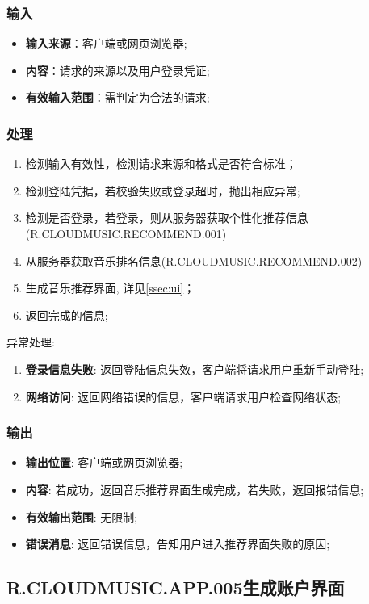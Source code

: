 \begin{enumerate}
\subsubsection{输入}
	\begin{itemize}
		\item \textbf{输入来源}：客户端或网页浏览器;
		\item \textbf{内容}：请求的来源以及用户登录凭证;
		\item \textbf{有效输入范围}：需判定为合法的请求;
	\end{itemize}
\subsubsection{处理}
	\begin{enumerate}
		\item 检测输入有效性，检测请求来源和格式是否符合标准；
		\item 检测登陆凭据，若校验失败或登录超时，抛出相应异常;
    \item 检测是否登录，若登录，则从服务器获取个性化推荐信息(R.CLOUDMUSIC.RECOMMEND.001)
		\item 从服务器获取音乐排名信息(R.CLOUDMUSIC.RECOMMEND.002)
		\item 生成音乐推荐界面, 详见\ref{ssec:ui}；
		\item 返回完成的信息;
	\end{enumerate}
	\noindent 异常处理: 
	\begin{enumerate}
		\item \textbf{登录信息失败}: 返回登陆信息失效，客户端将请求用户重新手动登陆;
		\item \textbf{网络访问}: 返回网络错误的信息，客户端请求用户检查网络状态;
	\end{enumerate}
\subsubsection{输出}
\begin{itemize}
	\item \textbf{输出位置}: 客户端或网页浏览器;
	\item \textbf{内容}: 若成功，返回音乐推荐界面生成完成，若失败，返回报错信息;
	\item \textbf{有效输出范围}: 无限制;
	\item \textbf{错误消息}: 返回错误信息，告知用户进入推荐界面失败的原因;
\end{itemize}

\subsection{R.CLOUDMUSIC.APP.005生成账户界面}

\end{enumerate}
